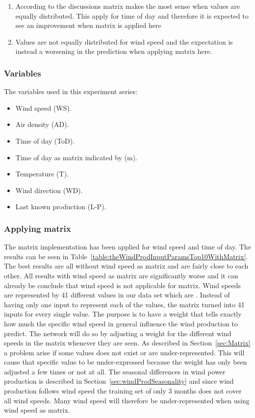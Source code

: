 \begin{enumerate}
\item According to the discussions matrix makes the most sense when values are equally distributed. This apply for time of day and therefore it is expected to see an improvement when matrix is applied here
\item Values are not equally distributed for wind speed and the expectation is instead a worsening in the prediction when applying matrix here.
\end{enumerate}

\subsubsection{Variables}
The variables used in this experiment series:

\begin{itemize}
\item Wind speed (WS).
\item Air density (AD).
\item Time of day (ToD).
\item Time of day as matrix indicated by (m).
\item Temperature (T).
\item Wind direction (WD).
\item Last known production (L-P).
\end{itemize}

\subsubsection{Applying matrix}
The matrix implementation has been applied for wind speed and time of day. The results can be seen in Table~\ref{table:theWindProdInputParamsTop10WithMatrix}. The best results are all without wind speed as matrix and are fairly close to each other. All results with wind speed as matrix are significantly worse and it can already be conclude that wind speed is not applicable for matrix. Wind speeds are represented by 41 different values in our data set which are . Instead of having only one input to represent each of the values, the matrix turned into 41 inputs for every single value. The purpose is to have a weight that tells exactly how much the specific wind speed in general influence the wind production to predict. The network will do so by adjusting a weight for the different wind speeds in the matrix whenever they are seen. As described in Section~\ref{sec:Matrix} a problem arise if some values does not exist or are under-represented. This will cause that specific value to be under-expressed because the weight has only been adjusted a few times or not at all. The seasonal differences in wind power production is described in Section~\ref{sec:windProdSeasonality} and since wind production follows wind speed the training set of only 3 months does not cover all wind speeds. Many wind speed will therefore be under-represented when using wind speed as matrix. 

